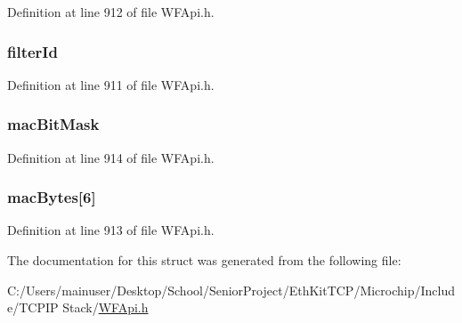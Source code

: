 Definition at line 912 of file W\+F\+Api.\+h.

\hypertarget{struct_w_f_multicast_config_struct_af4dfe7a73d68de57144857ed208b4ee1}{}
\subsubsection[{filter\+Id}]{ filter\+Id}\label{struct_w_f_multicast_config_struct_af4dfe7a73d68de57144857ed208b4ee1}


Definition at line 911 of file W\+F\+Api.\+h.

\hypertarget{struct_w_f_multicast_config_struct_aa38c85c998eb2ae76de051679393007c}{}
\subsubsection[{mac\+Bit\+Mask}]{ mac\+Bit\+Mask}\label{struct_w_f_multicast_config_struct_aa38c85c998eb2ae76de051679393007c}


Definition at line 914 of file W\+F\+Api.\+h.

\hypertarget{struct_w_f_multicast_config_struct_a60d846b0c2fd3e7038fcd48f246a3b57}{}
\subsubsection[{mac\+Bytes}]{ mac\+Bytes\mbox{[}6\mbox{]}}\label{struct_w_f_multicast_config_struct_a60d846b0c2fd3e7038fcd48f246a3b57}


Definition at line 913 of file W\+F\+Api.\+h.



The documentation for this struct was generated from the following file\+:\begin{DoxyCompactItemize}
\item 
C\+:/\+Users/mainuser/\+Desktop/\+School/\+Senior\+Project/\+Eth\+Kit\+T\+C\+P/\+Microchip/\+Include/\+T\+C\+P\+I\+P Stack/\hyperlink{_w_f_api_8h}{W\+F\+Api.\+h}\end{DoxyCompactItemize}

